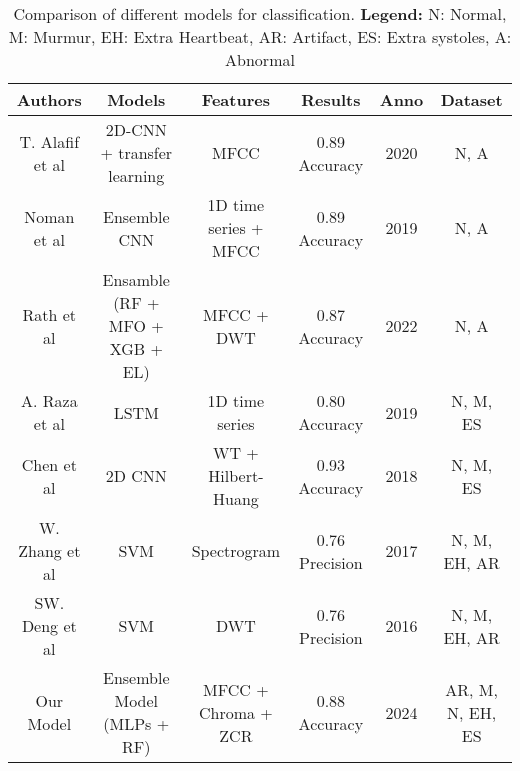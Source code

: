 \begin{table*}[ht!]
    \small
    \centering
    \begin{tabular}{|c|c|c|c|c|c|}
        \hline
        \textbf{Authors}                                                                & \textbf{Models}                & \textbf{Features}     & \textbf{Results} & \textbf{Anno} & \textbf{Dataset} \\ \hline
        T. Alafif et al \cite{Alafif_Boulares_Barnawi_Alafif_Althobaiti_Alferaidi_2020} & 2D-CNN + transfer learning     & MFCC                  & 0.89 Accuracy    & 2020          & N, A             \\ \hline
        Noman et al \cite{Noman_Ting_Salleh_Ombao_2019}                                 & Ensemble CNN                   & 1D time series + MFCC & 0.89 Accuracy    & 2019          & N, A             \\ \hline
        Rath et al \cite{Rath_Mishra_Panda_Pal_2022}                                    & Ensamble (RF + MFO + XGB + EL) & MFCC + DWT            & 0.87 Accuracy    & 2022          & N, A             \\ \hline
        A. Raza et al \cite{Raza_Mehmood_Ullah_Ahmad_Choi_On_2019}                      & LSTM                           & 1D time series        & 0.80 Accuracy    & 2019          & N, M, ES         \\ \hline
        Chen et al \cite{Chen_Ren_Hao_Hu_2018}                                          & 2D CNN                         & WT + Hilbert-Huang    & 0.93 Accuracy    & 2018          & N, M, ES         \\ \hline
        W. Zhang et al \cite{Zhang_Han_Deng_2017}                                       & SVM                            & Spectrogram           & 0.76 Precision   & 2017          & N, M, EH, AR     \\ \hline
        SW. Deng et al \cite{Deng_Han_2016}                                             & SVM                            & DWT                   & 0.76 Precision   & 2016          & N, M, EH, AR     \\ \hline
        Our Model                                                                       & Ensemble Model (MLPs + RF)     & MFCC + Chroma + ZCR   & 0.88 Accuracy    & 2024          & AR, M, N, EH, ES \\ \hline
    \end{tabular}
    \caption{Comparison of different models for classification. \textbf{Legend:} N: Normal, M: Murmur, EH: Extra Heartbeat, AR: Artifact, ES: Extra systoles, A: Abnormal}
\end{table*}